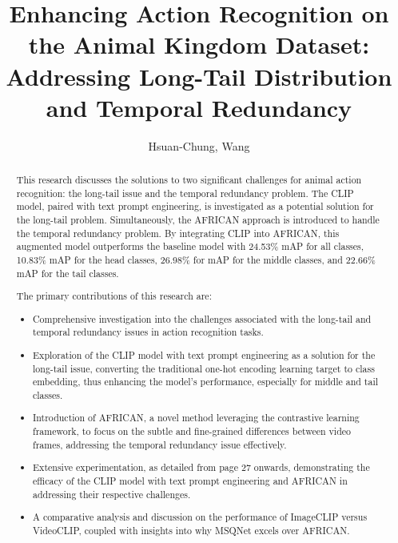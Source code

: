 \documentclass[
]{uob-thesis}
\title{Enhancing Action Recognition on the Animal Kingdom Dataset: Addressing Long-Tail Distribution and Temporal Redundancy}
\author{Hsuan-Chung, Wang}
\date{\printdatewithoutmonth{thesisdate}}
\begin{document}

\maketitle
\cleardoubleoddemptypage

\begin{abstract} %

This research discusses the solutions to two significant challenges for animal action recognition: the long-tail issue and the temporal redundancy problem. The CLIP model, paired with text prompt engineering, is investigated as a potential solution for the long-tail problem. Simultaneously, the AFRICAN approach is introduced to handle the temporal redundancy problem. By integrating CLIP into AFRICAN, this augmented model outperforms the baseline model with 24.53\% mAP for all classes, 10.83\% mAP for the head classes, 26.98\% for mAP for the middle classes, and 22.66\% mAP for the tail classes. 


The primary contributions of this research are:

\begin{itemize}
    \item Comprehensive investigation into the challenges associated with the long-tail and temporal redundancy issues in action recognition tasks.
    \item Exploration of the CLIP model with text prompt engineering as a solution for the long-tail issue, converting the traditional one-hot encoding learning target to class embedding, thus enhancing the model's performance, especially for middle and tail classes.
    \item Introduction of AFRICAN, a novel method leveraging the contrastive learning framework, to focus on the subtle and fine-grained differences between video frames, addressing the temporal redundancy issue effectively.
    \item Extensive experimentation, as detailed from page 27 onwards, demonstrating the efficacy of the CLIP model with text prompt engineering and AFRICAN in addressing their respective challenges.
    \item A comparative analysis and discussion on the performance of ImageCLIP versus VideoCLIP, coupled with insights into why MSQNet excels over AFRICAN.
\end{itemize}
\end{abstract}
\end{document}
